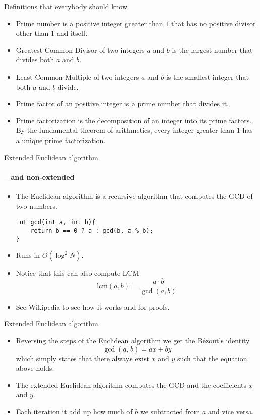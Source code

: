 \documentclass[12pt,t]{beamer}
\newcommand{\bi}{\begin{itemize}}
\newcommand{\ei}{\end{itemize}}
\begin{document}
\begin{frame}{Definitions that everybody should know}
  \vspace{15pt}
  \bi
    \item {\color{hilight}Prime number} is a positive integer greater than $1$
      that has no positive divisor other than $1$ and itself.
    \item {\color{hilight}Greatest Common Divisor} of two integers $a$ and $b$ is the
      largest number that divides both $a$ and $b$.
    \item {\color{hilight}Least Common Multiple} of two integers $a$ and $b$ is
      the smallest integer that both $a$ and $b$ divide.
    \item {\color{hilight}Prime factor} of an positive integer is a prime number that divides it.
    \item {\color{hilight}Prime factorization} is the decomposition of an
      integer into its prime factors. By the fundamental theorem of
      arithmetics, every integer greater than $1$ has a unique prime
      factorization.
  \ei
\end{frame}

\begin{frame}[fragile]{Extended Euclidean algorithm}
  \vspace{20pt}
  \framesubtitle{-- and non-extended}
  \bi
    \item The Euclidean algorithm is a recursive algorithm that computes the GCD of two numbers.
      \begin{verbatim}
int gcd(int a, int b){
    return b == 0 ? a : gcd(b, a % b);
}
    \end{verbatim}
    \item Runs in $O(\log^2 N)$.
    \item Notice that this can also compute LCM
      \[
        \text{lcm}(a, b) = \frac{a\cdot b}{\gcd(a,b)}
      \]
    \item See Wikipedia to see how it works and for proofs.
  \ei
\end{frame}

\begin{frame}[fragile]{Extended Euclidean algorithm}
  \vspace{20pt}
  \bi
    \item Reversing the steps of the Euclidean algorithm we get the B\'ezout's identity
      \[
        \gcd(a, b) = ax + by
      \]
    which simply states that there always exist $x$ and $y$ such that the equation above holds.
    \item The extended Euclidean algorithm computes the GCD and the coefficients $x$ and $y$.
    \item Each iteration it add up how much of $b$ we subtracted from $a$ and vice versa.
  \ei
\end{frame}
\end{document}
